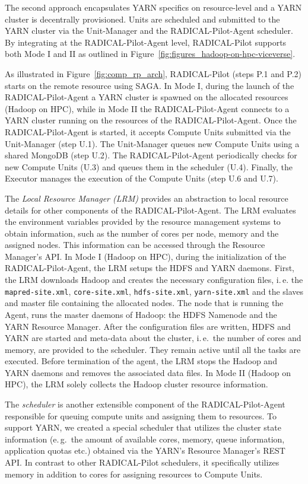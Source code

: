 The second approach encapsulates YARN specifics on resource-level and a YARN cluster is decentrally provisioned.
Units are scheduled and submitted to the YARN cluster via the Unit-Manager and the RADICAL-Pilot-Agent scheduler.
By integrating at the RADICAL-Pilot-Agent level, RADICAL-Pilot supports both Mode I and II as outlined in Figure~\ref{fig:figures_hadoop-on-hpc-viceverse}.

As illustrated in Figure~\ref{fig:comp_rp_arch}, RADICAL-Pilot  (steps P.1 and P.2) starts on the remote resource using SAGA.
In Mode I, during the launch of the RADICAL-Pilot-Agent a YARN cluster is spawned on the allocated resources (Hadoop on HPC), while in Mode II the RADICAL-Pilot-Agent connects to a YARN cluster running on the resources of the RADICAL-Pilot-Agent.
Once the RADICAL-Pilot-Agent is started, it accepts Compute Units submitted via the Unit-Manager (step U.1).
The Unit-Manager queues new Compute Units using a shared MongoDB (step U.2).
The RADICAL-Pilot-Agent periodically checks for new Compute Units (U.3) and queues them in the scheduler (U.4).
Finally, the Executor manages the execution of the Compute Units (step U.6 and U.7).

The \emph{Local Resource Manager (LRM)} provides an abstraction to local resource details for other components of the RADICAL-Pilot-Agent.
The LRM evaluates the environment variables provided by the resource management systems to obtain information, such as the number of cores per node, memory and the assigned nodes.
This information can be accessed through the Resource Manager's API.
In Mode I (Hadoop on HPC), during the initialization of the RADICAL-Pilot-Agent, the LRM setups the HDFS and YARN daemons.
First, the LRM downloads Hadoop and creates the necessary configuration files, i.\,e. the \texttt{mapred-site.xml}, \texttt{core-site.xml}, \texttt{hdfs-site.xml}, \texttt{yarn-site.xml} and the slaves and master file containing the allocated nodes.
The node that is running the Agent, runs the master daemons of Hadoop: the HDFS Namenode and the YARN Resource Manager.
After the configuration files are written, HDFS and YARN are started and meta-data about the cluster, i.\,e.\ the number of cores and memory, are provided to the scheduler.
They remain active until all the tasks are executed.
Before termination of the agent, the LRM stops the Hadoop and YARN daemons and removes the associated data files.
In Mode II (Hadoop on HPC), the LRM solely collects the Hadoop cluster resource information.

The \emph{scheduler} is another extensible component of the RADICAL-Pilot-Agent responsible for queuing compute units and assigning them to resources.
To support YARN, we created a special scheduler that utilizes the cluster state information (e.\,g.\ the amount of available cores, memory, queue information, application quotas etc.) obtained via the YARN's Resource Manager's REST API.
In contrast to other RADICAL-Pilot schedulers, it specifically utilizes memory in addition to cores for assigning resources to Compute Units.

